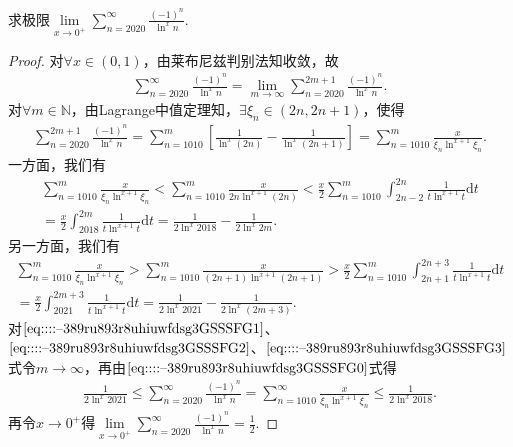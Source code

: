 \documentclass[../../main.tex]{subfiles}%
\begin{document}
\begin{example}
求极限$\underset{x\rightarrow 0^+}{\lim}\sum_{n=2020}^{\infty}{\frac{\left( -1 \right) ^n}{\ln ^xn}}.$
\end{example}
\begin{proof}
对$\forall x\in (0,1)$，由莱布尼兹判别法知收敛，故
\begin{align}\label{eq::::--389ru893r8uhiuwfdsg3GSSSFG0}
\sum\limits_{n=2020}^{\infty}\frac{(-1)^n}{\ln^x n}=\lim\limits_{m\rightarrow \infty}\sum\limits_{n=2020}^{2m+1}\frac{(-1)^n}{\ln^x n}.
\end{align}
对$\forall m\in \mathbb{N}$，由Lagrange中值定理知，$\exists \xi_n\in (2n,2n+1)$，使得
\begin{align}\label{eq::::--389ru893r8uhiuwfdsg3GSSSFG1}
\sum\limits_{n=2020}^{2m+1}\frac{(-1)^n}{\ln^x n}=\sum\limits_{n=1010}^{m}\left[ \frac{1}{\ln^x (2n)}-\frac{1}{\ln^x (2n+1)} \right]=\sum\limits_{n=1010}^{m}\frac{x}{\xi_n \ln^{x+1}\xi_n}.
\end{align}
一方面，我们有
\begin{align}\label{eq::::--389ru893r8uhiuwfdsg3GSSSFG2}
\sum\limits_{n=1010}^{m}\frac{x}{\xi_n \ln^{x+1}\xi_n}<\sum\limits_{n=1010}^{m}\frac{x}{2n\ln^{x+1}(2n)}<\frac{x}{2}\sum\limits_{n=1010}^{m}\int_{2n-2}^{2n}\frac{1}{t\ln^{x+1}t}\mathrm{d}t\nonumber\\
=\frac{x}{2}\int_{2018}^{2m}\frac{1}{t\ln^{x+1}t}\mathrm{d}t=\frac{1}{2\ln^x 2018}-\frac{1}{2\ln^x 2m}.
\end{align}
另一方面，我们有
\begin{align}\label{eq::::--389ru893r8uhiuwfdsg3GSSSFG3}
\sum\limits_{n=1010}^{m}\frac{x}{\xi_n \ln^{x+1}\xi_n}>\sum\limits_{n=1010}^{m}\frac{x}{(2n+1)\ln^{x+1}(2n+1)}>\frac{x}{2}\sum\limits_{n=1010}^{m}\int_{2n+1}^{2n+3}\frac{1}{t\ln^{x+1}t}\mathrm{d}t\nonumber\\
=\frac{x}{2}\int_{2021}^{2m+3}\frac{1}{t\ln^{x+1}t}\mathrm{d}t=\frac{1}{2\ln^x 2021}-\frac{1}{2\ln^x (2m+3)}.
\end{align}
对$\eqref{eq::::--389ru893r8uhiuwfdsg3GSSSFG1}$、$\eqref{eq::::--389ru893r8uhiuwfdsg3GSSSFG2}$、$\eqref{eq::::--389ru893r8uhiuwfdsg3GSSSFG3}$式令$m\rightarrow \infty$，再由$\eqref{eq::::--389ru893r8uhiuwfdsg3GSSSFG0}$式得
\begin{align*}
\frac{1}{2\ln^x 2021}\leqslant \sum\limits_{n=2020}^{\infty}\frac{(-1)^n}{\ln^x n}=\sum\limits_{n=1010}^{\infty}\frac{x}{\xi_n \ln^{x+1}\xi_n}\leqslant \frac{1}{2\ln^x 2018}.
\end{align*}
再令$x\rightarrow 0^+$得$\lim\limits_{x\rightarrow 0^+}\sum\limits_{n=2020}^{\infty}\frac{(-1)^n}{\ln^x n}=\frac{1}{2}.$\end{proof}
\end{document}
